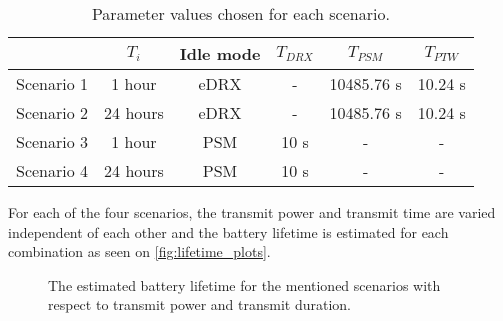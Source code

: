 \begin{table}[H]
\centering
\begin{tabular}{|c|c|c|c|c|c|} \hline
            & $T_i$         & Idle mode    & $T_{DRX}$    & $T_{PSM}$    & $T_{PTW}$    \\ \hline
Scenario 1    & 1 hour     & eDRX         & -            & 10485.76 s& 10.24 s    \\ \hline
Scenario 2    & 24 hours     & eDRX         & -            & 10485.76 s& 10.24 s    \\ \hline
Scenario 3    & 1 hour     & PSM        & 10 s        & -            & -            \\ \hline
Scenario 4    & 24 hours     & PSM        & 10 s        & -            & -            \\ \hline
\end{tabular}
\caption{Parameter values chosen for each scenario.}
\label{tab:scenario_description}
\end{table}

For each of the four scenarios, the transmit power and transmit time are varied independent of each other and the battery lifetime is estimated for each combination as seen on \autoref{fig:lifetime_plots}.


\begin{figure}[H]
\centering
\begin{minipage}{0.48\textwidth}
\resizebox{\textwidth}{!}{
}
\end{minipage}
\hfill
\begin{minipage}{0.48\textwidth}
\resizebox{\textwidth}{!}{
}
\end{minipage}
\begin{minipage}{0.48\textwidth}
\resizebox{\textwidth}{!}{
}
\end{minipage}
\hfill
\begin{minipage}{0.48\textwidth}
\resizebox{\textwidth}{!}{
}
\end{minipage}
\caption{The estimated battery lifetime for the mentioned scenarios with respect to transmit power and transmit duration.}
\label{fig:lifetime_plots}
\end{figure}

